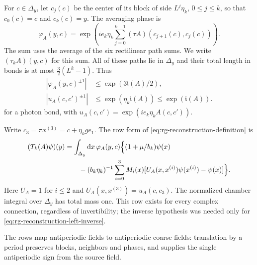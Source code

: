 For $c\in\Delta_y$, let $c_j(c)$ be the center of its block
of side $L^j\eta_k$, $0\le j\le k$, so that $c_0(c)=c$ and
$c_k(c)=y$. The averaging phase is
\begin{equation}\label{eq:rg-reconstruction-phase}
 \varphi_A(y,c)=\exp\left(ie_k\eta_k
                 \sum_{j=0}^{k-1}(\tau A)(c_{j+1}(c),c_j(c))\right).
\end{equation}
The sum uses the average of the six rectilinear path sums.
We write $(\tau_kA)(y,c)$ for this sum.
All of these paths lie in $\Delta_y$ and their total length
in bonds is at most $\frac32(L^k-1)$. Thus
\begin{equation}\label{eq:rg-reconstruction-phase-moduli}
 \begin{aligned}
 |\varphi_A(y,c)^{\pm1}|&\le\exp(3\mathfrak i(A)/2),\\
 |u_A(c,c')^{\pm1}|&\le\exp(\eta_k\mathfrak i(A))
                                             \le\exp(\mathfrak i(A)).
 \end{aligned}
\end{equation}
for a photon bond, with $u_A(c,c')=\exp(ie_k\eta_k A(c,c'))$.

Write \(c_3=\pi x^{(3)}=c+\eta_kge_1\). The row form of
\eqref{eq:rg-reconstruction-definition} is
\begin{equation}\label{eq:rg-reconstruction-row}
 \begin{aligned}
 (T_k(A)\psi)(y)
 &=\int_{\Delta_y}\mathrm d x\,\varphi_A(y,c)
                  \Bigl\{(1+\mu/b_k)\psi(x)\\
 &\qquad-(b_k\eta_k)^{-1}\sum_{i=0}^3M_i(x)
           [U_A(x,x^{(i)})\psi(x^{(i)})-\psi(x)]\Bigr\}.
 \end{aligned}
\end{equation}
Here $U_A=1$ for $i\le2$ and $U_A(x,x^{(3)})=u_A(c,c_3)$.
The normalized chamber integral over $\Delta_y$ has total mass
one. This row exists for every complex connection, regardless
of invertibility; the inverse hypothesis was needed only for
\eqref{eq:rg-reconstruction-left-inverse}.

The rows map antiperiodic fields to antiperiodic coarse fields:
translation by a period preserves blocks, neighbors and phases,
and supplies the single antiperiodic sign from the source field.

